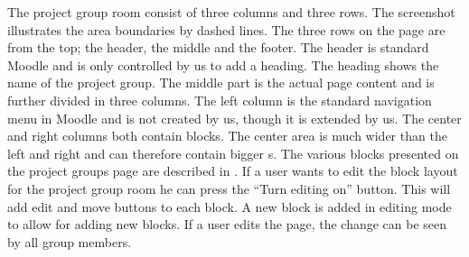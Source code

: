 The project group room consist of three columns and three rows. 
The screenshot illustrates the area boundaries by dashed lines. 
The three rows on the page are from the top; the header, the middle and the footer. 
The header is standard Moodle and is only controlled by us to add a heading. 
The heading shows the name of the project group. 
The middle part is the actual page content and is further divided in three columns. 
The left column is the standard navigation menu in Moodle and is not created by us, though it is extended by us.
The center and right columns both contain blocks.
The center area is much wider than the left and right and can therefore contain bigger \block{}s. 
The various blocks presented on the project groups page are described in . 
If a user wants to edit the block layout for the project group room he can press the ``Turn editing on'' button. 
This will add edit and move buttons to each block. 
A new block is added in editing mode to allow for adding new blocks. 
If a user edits the page, the change can be seen by all group members. 



